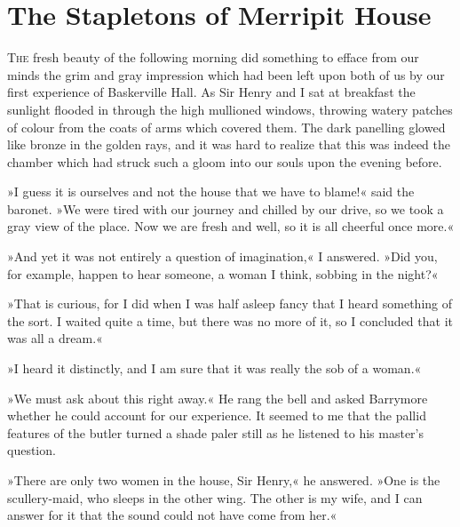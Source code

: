 \chapter{The Stapletons of Merripit House}
\lettrine[lines=1]{T}{he} fresh beauty of the following morning did something to efface from our minds the grim and gray impression which had been left upon both of us by our first experience of Baskerville Hall. As Sir Henry and I sat at breakfast the sunlight flooded in through the high mullioned windows, throwing watery patches of colour from the coats of arms which covered them. The dark panelling glowed like bronze in the golden rays, and it was hard to realize that this was indeed the chamber which had struck such a gloom into our souls upon the evening before.

»I guess it is ourselves and not the house that we have to blame!« said the baronet. »We were tired with our journey and chilled by our drive, so we took a gray view of the place. Now we are fresh and well, so it is all cheerful once more.«

»And yet it was not entirely a question of imagination,« I an\-swered. »Did you, for example, happen to hear someone, a woman I think, sobbing in the night?«

»That is curious, for I did when I was half asleep fancy that I heard something of the sort. I waited quite a time, but there was no more of it, so I concluded that it was all a dream.«

»I heard it distinctly, and I am sure that it was really the sob of a woman.«

»We must ask about this right away.« He rang the bell and asked Barrymore whether he could account for our experience. It seemed to me that the pallid features of the butler turned a shade paler still as he listened to his master's question.

»There are only two women in the house, Sir Henry,« he an\-swered. »One is the scullery-maid, who sleeps in the other wing. The other is my wife, and I can answer for it that the sound could not have come from her.«

